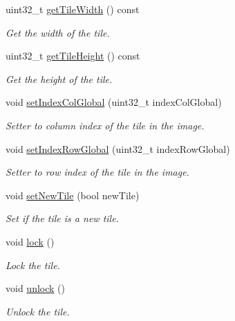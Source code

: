 \begin{DoxyCompactItemize}
uint32\+\_\+t \hyperlink{classfi_1_1CachedTile_acfc950d0ebe9da5cc6c67af567526d4f}{get\+Tile\+Width} () const
\begin{DoxyCompactList}\small\item\em Get the width of the tile. \end{DoxyCompactList}\item 
uint32\+\_\+t \hyperlink{classfi_1_1CachedTile_ae83ddf4e93fd9ba481b9edd05384dcc2}{get\+Tile\+Height} () const
\begin{DoxyCompactList}\small\item\em Get the height of the tile. \end{DoxyCompactList}\item 
void \hyperlink{classfi_1_1CachedTile_ad95876a2ad4b7bd2199c9645047d8e4c}{set\+Index\+Col\+Global} (uint32\+\_\+t index\+Col\+Global)
\begin{DoxyCompactList}\small\item\em Setter to column index of the tile in the image. \end{DoxyCompactList}\item 
void \hyperlink{classfi_1_1CachedTile_a18d2ea689e777d9d341fa09564edc752}{set\+Index\+Row\+Global} (uint32\+\_\+t index\+Row\+Global)
\begin{DoxyCompactList}\small\item\em Setter to row index of the tile in the image. \end{DoxyCompactList}\item 
void \hyperlink{classfi_1_1CachedTile_afc0c6c1365b9a4205c221f1d061c3611}{set\+New\+Tile} (bool new\+Tile)
\begin{DoxyCompactList}\small\item\em Set if the tile is a new tile. \end{DoxyCompactList}\item 
void \hyperlink{classfi_1_1CachedTile_a996218bd6a061692288167946515b93b}{lock} ()
\begin{DoxyCompactList}\small\item\em Lock the tile. \end{DoxyCompactList}\item 
void \hyperlink{classfi_1_1CachedTile_a2ea14c7fc1599f72a5d725ae7983457d}{unlock} ()
\begin{DoxyCompactList}\small\item\em Unlock the tile. \end{DoxyCompactList}\end{DoxyCompactItemize}
